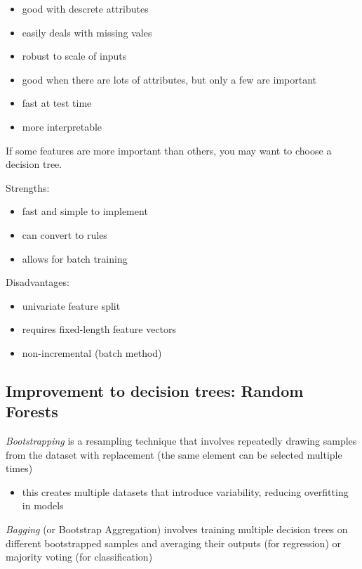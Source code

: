 \documentclass[11pt]{article}
\begin{document}
\begin{itemize}
\tightlist
\item
  good with descrete attributes
\item
  easily deals with missing vales
\item
  robust to scale of inputs
\item
  good when there are lots of attributes, but only a few are important
\item
  fast at test time
\item
  more interpretable
\end{itemize}

If some features are more important than others, you may want to choose
a decision tree.

Strengths:

\begin{itemize}
\tightlist
\item
  fast and simple to implement
\item
  can convert to rules
\item
  allows for batch training
\end{itemize}

Disadvantages:

\begin{itemize}
\tightlist
\item
  univariate feature split
\item
  requires fixed-length feature vectors
\item
  non-incremental (batch method)
\end{itemize}

\subsection{Improvement to decision trees: Random
Forests}\label{improvement-to-decision-trees-random-forests}

\emph{Bootstrapping} is a resampling technique that involves repeatedly
drawing samples from the dataset with replacement (the same element can
be selected multiple times)

\begin{itemize}
\tightlist
\item
  this creates multiple datasets that introduce variability, reducing
  overfitting in models
\end{itemize}

\emph{Bagging} (or Bootstrap Aggregation) involves training multiple
decision trees on different bootstrapped samples and averaging their
outputs (for regression) or majority voting (for classification)
\end{document}
